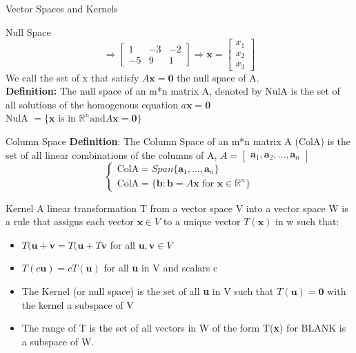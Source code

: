\documentclass[a4paper, 12pt]{article}
\begin{document}
\begin{section}{Vector Spaces and Kernels}
\begin{subsection}{Null Space}
\begin{equation}
\end{equation}
\begin{equation}
\Rightarrow \begin{bmatrix} 1&-3&-2\\ -5&9&1 \end{bmatrix} 
\Rightarrow
\textbf{x}=\begin{bmatrix} x_1\\ x_2\\ x_3 \end{bmatrix} 
\end{equation}
We call the set of x that satisfy $A\textbf{x}=\textbf{0}$ the 
null space of A.
\\ \noindent\textbf{Definition:} The null space of an m*n matrix A,
denoted by NulA is the set of all solutions of the homogenous equation 
$a\textbf{x}= \textbf{0}$\\
NulA $=\{ \textbf{x} \mbox{ is in } \mathbb{R}^{n} \mbox{and} 
A\textbf{x}=\textbf{0}\}$
\end{subsection}

\begin{subsection}{Column Space}
\noindent \textbf{Definition}: 
The Column Space of an m*n matrix A (ColA) is the set of all linear 
combinations of the columns of A, $A=\begin{bmatrix} 
\textbf{a}_{1}, \textbf{a}_{2},\dots, \textbf{a}_{n} \end{bmatrix}$
\begin{equation}
\begin{cases}
\mbox{ColA}=Span\{\textbf{a}_{1},\dots, \textbf{a}_{n}\} \\
\mbox{ColA} = \{ \textbf{b}: \textbf{b}=A\textbf{x} \mbox{ for } 
	\textbf{x} \in\mathbb{R}^{n}\}
\end{cases}
\end{equation}
\end{subsection}
\begin{subsection}{Kernel}
A linear transformation T from a vector space V into a vector space W
is a rule that assigns each vector $\textbf{x}\in V$ to a unique vector
$T(\textbf{x})$ in w such that:
\begin{itemize}
\item{$T(\textbf{u}+\textbf{v}=T(\textbf{u}+T\textbf{v}$ for all
	$\textbf{u},\textbf{v}\in V$}
\item{$T(c\textbf{u})=cT(\textbf{u})$ for all \textbf{u} in V and 
	scalars c}
\item{The Kernel (or null space) is the set of all \textbf{u} in V such
that $T(\textbf{u})=\textbf{0}$} with the kernel a subspace of V
\item{The range of T is the set of all vectors in W of the form
	T(\textbf{x}) for BLANK is a subspace of W.}
\end{itemize}
\end{subsection}


\end{section}
\end{document}
